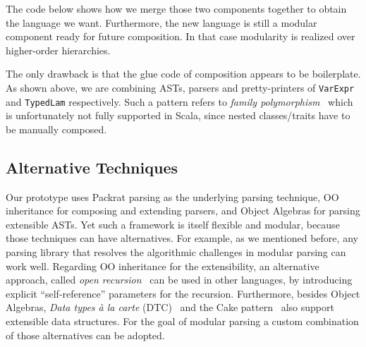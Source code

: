 
The code below shows how we merge those two components together to obtain the language we want. Furthermore, the new language is still a modular
component ready for future composition. In that case modularity is realized over higher-order hierarchies.


The only drawback is that the glue code of composition appears to be
boilerplate. As shown above, we are combining ASTs, parsers and
pretty-printers of \lstinline{VarExpr} and \lstinline{TypedLam}
respectively. Such a pattern refers to \textit{family
  polymorphism}~\cite{ernst01FP} which is unfortunately not fully supported
in Scala, since nested classes/traits have to be manually composed.

\subsection{Alternative Techniques}

Our prototype uses Packrat parsing as the underlying parsing technique, OO inheritance for composing and extending parsers, and Object Algebras for parsing extensible ASTs. Yet such a framework is itself flexible and modular, because those techniques can have alternatives.
For example, as we mentioned before, any parsing library
that resolves the algorithmic challenges in modular parsing can work well. Regarding OO inheritance for the extensibility, an alternative approach, called \textit{open recursion}~\cite{CookThesis} can be used in other languages, by introducing explicit ``self-reference'' parameters for the recursion. Furthermore, besides Object Algebras, \textit{Data types \`a la carte} (DTC)~\cite{swierstra2008data} and the Cake pattern~\cite{odersky2005independently} also support extensible data structures. For the goal of modular parsing a custom combination of those alternatives can be adopted.
